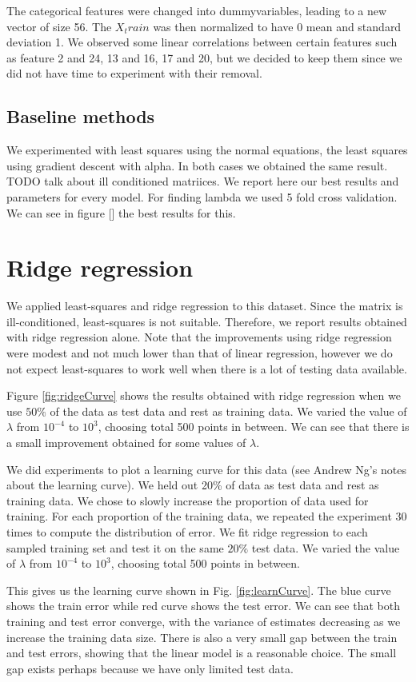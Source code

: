 \documentclass{article} %
\begin{document}
The categorical features were changed into dummyvariables, leading to a new vector of size 56. The $X_train$ was then normalized to have 0 mean and standard deviation 1.
We observed some linear correlations between certain features such as feature 2 and 24, 13 and 16, 17 and 20, but we decided to keep them since we did not have time to experiment with their removal.
\subsection{Baseline methods}
 We experimented with least squares using the normal equations, the least squares using gradient descent with alpha.  In both cases we obtained the same result. TODO talk about ill conditioned matriices.
 We report here our best results and parameters for every model. 
 For finding lambda we used 5 fold cross validation. We can see in figure [] the best results for this.
  
\section{Ridge regression}
We applied least-squares and ridge regression to this dataset. Since the matrix is ill-conditioned, least-squares is not suitable. Therefore, we report results obtained with ridge regression alone. Note that the improvements using ridge regression were modest and not much lower than that of linear regression, however we do not expect least-squares to work well when there is a lot of testing data available. 

Figure \ref{fig:ridgeCurve} shows the results obtained with ridge regression when we use $50\%$ of the data as test data and rest as training data. We varied the value of $\lambda$ from $10^{-4}$ to $10^3$, choosing total 500 points in between. We can see that there is a small improvement obtained for some values of $\lambda$.

We did experiments to plot a learning curve for this data (see Andrew Ng's notes about the learning curve). We held out 20\% of data as test data and rest as training data. We chose to slowly increase the proportion of data used for training. For each proportion of the training data, we repeated the experiment 30 times to compute the distribution of error. We fit ridge regression to each sampled training set and test it on the same $20\%$ test data. We varied the value of $\lambda$ from $10^{-4}$ to $10^3$, choosing total 500 points in between.

This gives us the learning curve shown in Fig. \ref{fig:learnCurve}. The blue curve shows the train error while red curve shows the test error. We can see that both training and test error converge, with the variance of estimates decreasing as we increase the training data size. There is also a very small gap between the train and test errors, showing that the linear model is a reasonable choice. The small gap exists perhaps because we have only limited test data.
\end{document}

